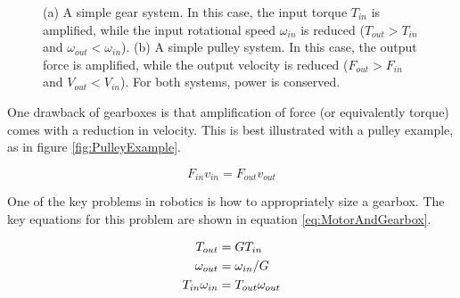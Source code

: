 \begin{figure}[h]		%
\begin{centering}
  \hspace{0.1\textwidth}%
\end{centering}
\caption[Diagram: Force Amplification with Gearbox and Pulley Systems]{(a) A simple gear system. In this case, the input torque $T_{in}$ is amplified, while the input rotational speed $\omega_{in}$ is reduced ($T_{out}>T_{in}$ and $\omega_{out}<\omega_{in}$). (b) A simple pulley system. In this case, the output force is amplified, while the output velocity is reduced ($F_{out}>F_{in}$ and $V_{out}<V_{in}$). For both systems, power is conserved.}
\label{fig:GearboxAndPulleyExample}
\end{figure}
%

One drawback of gearboxes is that amplification of force (or equivalently torque) comes with a reduction in velocity. This is best illustrated with a pulley example, as in figure \ref{fig:PulleyExample}.

\begin{equation}
F_{in}v_{in} = F_{out}v_{out}
\label{eq:PulleyExample}
\end{equation}

One of the key problems in robotics is how to appropriately size a gearbox. The key equations for this problem are shown in equation \ref{eq:MotorAndGearbox}.

\begin{align}
T_{out} &=GT_{in} \notag \\
\omega_{out} &=\omega_{in}/G \notag \\
T_{in}\omega_{in}&=T_{out}\omega_{out}
\label{eq:MotorAndGearbox}
\end{align}


